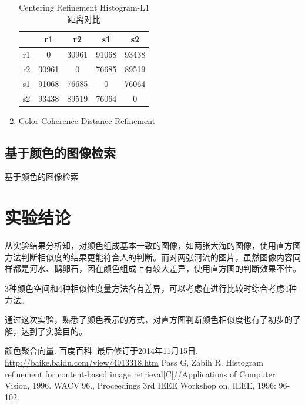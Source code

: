 \documentclass[a4paper, 12pt, UTF8]{article}
\begin{document}
\begin{enumerate}
\begin{table}[h!]
    \centering
    \caption{Centering Refinement Histogram-L1距离对比}
    \begin{tabular}{ccccc}
         & r1 & r2 & s1 & s2 \\ \hline
        r1 & 0 & 30961 & 91068 & 93438 \\ \hline
        r2 & 30961 & 0 & 76685 & 89519 \\ \hline
        s1 & 91068 & 76685 & 0 & 76064 \\ \hline
        s2 & 93438 & 89519 & 76064 & 0 \\ \hline
    \end{tabular}
\end{table}

\item Color Coherence Distance Refinement

\end{enumerate}


\subsection{基于颜色的图像检索}

基于颜色的图像检索


\section{实验结论}

从实验结果分析知，对颜色组成基本一致的图像，如两张大海的图像，使用直方图方法判断相似度的结果更能符合人的判断。而对两张河流的图片，虽然图像内容同样都是河水、鹅卵石，因在颜色组成上有较大差异，使用直方图的判断效果不佳。

3种颜色空间和4种相似性度量方法各有差异，可以考虑在进行比较时综合考虑4种方法。

通过这次实验，熟悉了颜色表示的方式，对直方图判断颜色相似度也有了初步的了解，达到了实验目的。


\renewcommand{\refname}{参考}
\begin{thebibliography}{9}
 颜色聚合向量. 百度百科. 最后修订于2014年11月15日. \url{http://baike.baidu.com/view/4913318.htm}
 Pass G, Zabih R. Histogram refinement for content-based image retrieval[C]//Applications of Computer Vision, 1996. WACV'96., Proceedings 3rd IEEE Workshop on. IEEE, 1996: 96-102.
\end{thebibliography}
\end{document}
